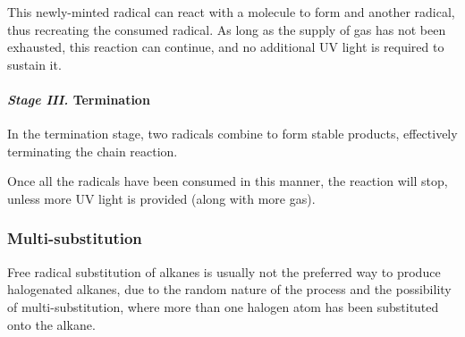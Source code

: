 					This newly-minted  radical can react with a  molecule to form  and another
					\ch{\Cl} radical, thus recreating the consumed radical. As long as the supply of  gas has
					not been exhausted, this reaction can continue, and no additional UV light is required to sustain it.


				\pagebreak
				\paragraph{\textit{Stage III.}\hspace{5mm} Termination}

					In the termination stage, two radicals combine to form stable products, effectively terminating the chain reaction.


					Once all the radicals have been consumed in this manner, the reaction will stop, unless more UV light is provided (along
					with more  gas).




			\subsubsection{Multi-substitution}

				Free radical substitution of alkanes is usually not the preferred way to produce
				halogenated alkanes, due to the random nature of the process and the possibility of multi-substitution,
				where more than one halogen atom has been substituted onto the alkane.

